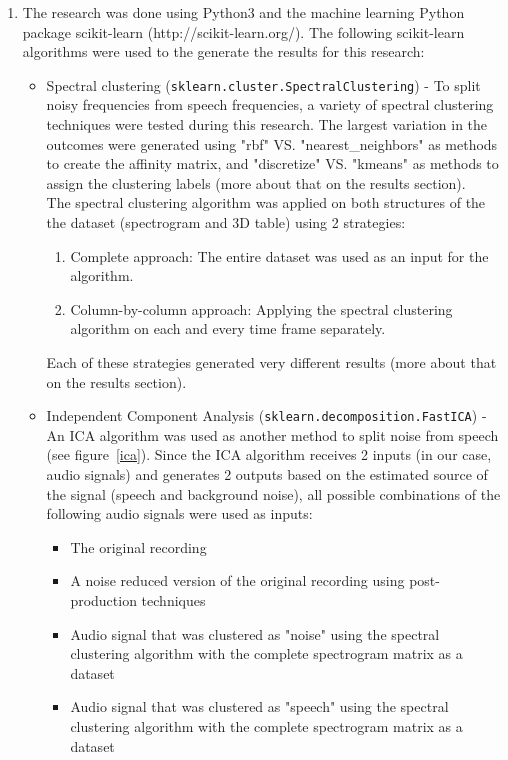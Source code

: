 \documentclass[10pt,twocolumn]{article}
\begin{document}
\begin{enumerate}
  \item The research was done using Python3 and the machine learning Python package scikit-learn (http://scikit-learn.org/). The following scikit-learn algorithms were used to the generate the results for this research:
    \begin{itemize}
      \item Spectral clustering (\texttt{sklearn.cluster.SpectralClustering}) \cite{ref2} - To split noisy frequencies from speech frequencies, a variety of spectral clustering techniques were tested during this research. The largest variation in the outcomes were generated using "rbf" VS. "nearest\_neighbors" as methods to create the affinity matrix, and "discretize" VS. "kmeans" as methods to assign the clustering labels (more about that on the results section).\\
            The spectral clustering algorithm was applied on both structures of the the dataset (spectrogram and 3D table) using 2 strategies:
        \begin{enumerate}
          \item Complete approach: The entire dataset was used as an input for the algorithm.
          \item Column-by-column approach: Applying the spectral clustering algorithm on each and every time frame separately.
        \end{enumerate}
        Each of these strategies generated very different results (more about that on the results section).
      \item Independent Component Analysis (\texttt{sklearn.decomposition.FastICA}) \cite{ref4} \cite{ref3} - An ICA algorithm was used as another method to split noise from speech (see figure~\ref{ica}). Since the ICA algorithm receives 2 inputs (in our case, audio signals) and generates 2 outputs based on the estimated source of the signal (speech and background noise), all possible combinations of the following audio signals were used as inputs:
        \begin{itemize}
          \item The original recording
          \item A noise reduced version of the original recording using post-production techniques
          \item Audio signal that was clustered as "noise" using the spectral clustering algorithm with the complete spectrogram matrix as a dataset
          \item Audio signal that was clustered as "speech" using the spectral clustering algorithm with the complete spectrogram matrix as a dataset

\end{itemize}
\end{itemize}
\end{enumerate}
\end{document}
